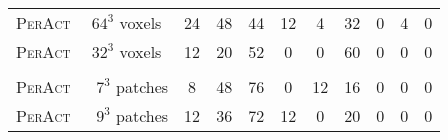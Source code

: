 \documentclass{article}
\newcommand{\model}{\textsc{PerAct}}
\begin{document}
\begin{table}[!b]
\begin{tabular}{lccccccccc}
\rowcolor[rgb]{0.96,0.96,1} \model~ $\phantom{0}64^3$ voxels    & 24                                                    & 48                                                    & 44                                                         & 12                                                       & 4                                                   & 32                                                      & 0                                                   & 4                                                    & 0                                                      \\
\rowcolor[rgb]{0.96,0.96,1} \model~ $\phantom{0}32^3$ voxels    & 12                                                    & 20                                                    & 52                                                         & 0                                                        & 0                                                   & 60                                                      & 0                                                   & 0                                                    & 0                                                      \\& \multicolumn{1}{l}{}                                  & \multicolumn{1}{l}{}                                  & \multicolumn{1}{l}{}                                       & \multicolumn{1}{l}{}                                     & \multicolumn{1}{l}{}                                & \multicolumn{1}{l}{} \\[-0.6em]
\rowcolor[rgb]{1.0,1.0,0.90} \model~ $\phantom{0.}7^3$ patches    & 8                                                     & 48                                                    & 76                                                         & 0                                                        & 12                                                  & 16                                                      & 0                                                   & 0                                                    & 0                                                      \\
\rowcolor[rgb]{1.0,1.0,0.90} \model~ $\phantom{0.}9^3$ patches    & 12                                                    & 36                                                    & 72                                                         & 12                                                       & 0                                                   & 20                                                      & 0                                                   & 0                                                    & 0                                                      \\
\bottomrule
\end{tabular}
\end{table} 
\end{document}
